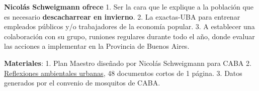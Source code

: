 \textbf{Nicolás Schweigmann ofrece} 1. Ser la cara que le explique a la
población que es necesario \textbf{descacharrear en invierno}. 2. La
exactas-UBA para entrenar empleados públicos y/o trabajadores de la
economía popular. 3. A establecer una colaboración con su grupo,
runiones regulares durante todo el año, donde evaluar las acciones a
implementar en la Provincia de Buenos Aires.

\textbf{Materiales}: 1. Plan Maestro diseñado por Nicolás Schweigmann
para CABA 2.
\href{http://www.ege.fcen.uba.ar/novedades/extension-y-popularizacion/reflexiones-ambientales/}{Reflexiones
ambientales urbanas}, 48 documentos cortos de 1 página. 3. Datos
generados por el convenio de mosquitos de CABA.
